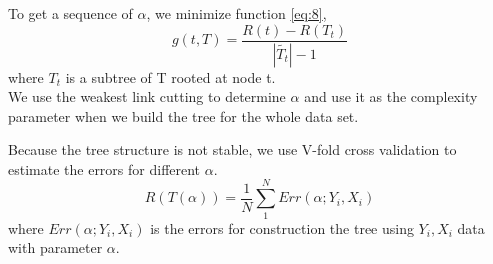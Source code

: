 To get a sequence of $\alpha$, we minimize function \ref{eq:8},
\begin{equation}\label{eq:8}
g(t,T) = \frac{R(t) - R(T_{t})}{\left|\tilde{T_{t}}\right| - 1}
\end{equation}
where $T_{t}$ is a subtree of T rooted at node t.\\
We use the weakest link cutting to determine $\alpha$ and use it as the complexity parameter when we build the tree for the whole data set. 

Because the tree structure is not stable, we use V-fold cross validation to estimate the errors for different $\alpha$.
\begin{equation}\label{eq:9}
R(T(\alpha)) = \frac{1}{N}\sum_{1}^{N}Err(\alpha;Y_{i}, X_{i})
\end{equation}
where $Err(\alpha;Y_{i}, X_{i})$  is the errors for construction the tree using $Y_{i}, X_{i}$ data with parameter $\alpha$. 














